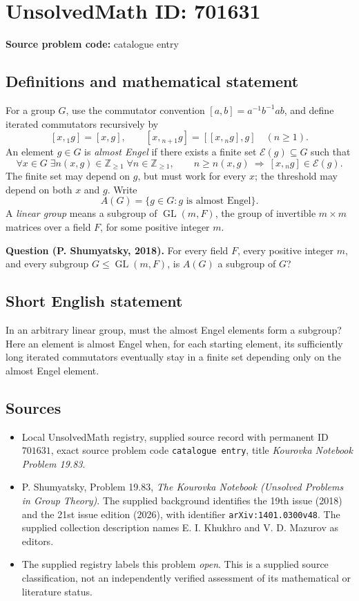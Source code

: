 \documentclass[11pt]{article}
\newcommand{\Z}{\mathbb{Z}}
\begin{document}
\section*{UnsolvedMath ID: 701631}
\textbf{Source problem code:} catalogue entry
\subsection{Definitions and mathematical statement}
For a group \(G\), use the commutator convention \([a,b]=a^{-1}b^{-1}ab\), and define iterated commutators recursively by
\[
[x,{}_1 g]=[x,g],\qquad [x,{}_{n+1}g]=[[x,{}_n g],g]\quad(n\geq 1).
\]
An element \(g\in G\) is \emph{almost Engel} if there exists a finite set \(\mathscr E(g)\subseteq G\) such that
\[
\forall x\in G\;\exists n(x,g)\in\Z_{\geq 1}\;\forall n\in\Z_{\geq 1},\qquad
n\geq n(x,g)\ \Longrightarrow\ [x,{}_n g]\in\mathscr E(g).
\]
The finite set may depend on \(g\), but must work for every \(x\); the threshold may depend on both \(x\) and \(g\). Write
\[
A(G)=\{g\in G:g\text{ is almost Engel}\}.
\]
A \emph{linear group} means a subgroup of \(\operatorname{GL}(m,F)\), the group of invertible \(m\times m\) matrices over a field \(F\), for some positive integer \(m\).

\textbf{Question (P. Shumyatsky, 2018).} For every field \(F\), every positive integer \(m\), and every subgroup \(G\leq\operatorname{GL}(m,F)\), is \(A(G)\) a subgroup of \(G\)?
\subsection{Short English statement}
In an arbitrary linear group, must the almost Engel elements form a subgroup? Here an element is almost Engel when, for each starting element, its sufficiently long iterated commutators eventually stay in a finite set depending only on the almost Engel element.
\subsection{Sources}
\begin{itemize}
\item Local UnsolvedMath registry, supplied source record with permanent ID \(701631\), exact source problem code \texttt{catalogue entry}, title \emph{Kourovka Notebook Problem 19.83}.
\item P. Shumyatsky, Problem 19.83, \emph{The Kourovka Notebook (Unsolved Problems in Group Theory)}. The supplied background identifies the 19th issue (2018) and the 21st issue edition (2026), with identifier \texttt{arXiv:1401.0300v48}. The supplied collection description names E. I. Khukhro and V. D. Mazurov as editors.
\item The supplied registry labels this problem \emph{open}. This is a supplied source classification, not an independently verified assessment of its mathematical or literature status.
\end{itemize}
\end{document}
